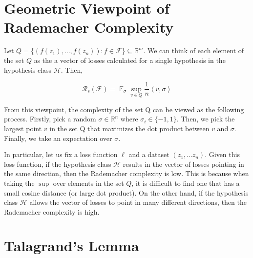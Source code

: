 \documentclass[11pt]{article}
\DeclareMathOperator*{\E}{\mathbb{E}}
\newtheorem{theorem}{Theorem}
\begin{document}


\section{Geometric Viewpoint of Rademacher Complexity}

Let $Q=\{(f(z_1),...,f(z_n)): f \in \mathcal{F}\} \subseteq \mathbb{R}^m$. We can think of each element of the set $Q$ as the a vector of losses calculated for a single hypothesis in the hypothesis class $\mathcal{H}$. Then,

\begin{equation}
\mathcal{R}_s(\mathcal{F}) = \E_{\sigma} \sup_{v \in Q} \frac{1}{n} \left<v,\sigma\right>
\end{equation}

From this viewpoint, the complexity of the set Q can be viewed as the following process. Firstly, pick a random $\sigma \in \mathbb{R}^n$ where $\sigma_i \in \{-1,1\}$. Then, we pick the largest point $v$ in the set Q that maximizes the dot product between $v$ and $\sigma$. Finally, we take an expectation over $\sigma$.

In particular, let us fix a loss function $\ell$ and a dataset $(z_1,...z_n)$. Given this loss function, if the hypothesis class $\mathcal{H}$ results in the vector of losses pointing in the same direction, then the Rademacher complexity is low. This is because when taking the $\sup$ over elements in the set $Q$, it is difficult to find one that has a small cosine distance (or large dot product). On the other hand, if the hypothesis class $\mathcal{H}$ allows the vector of losses to point in many different directions, then the Rademacher complexity is high.

\section{Talagrand's Lemma}
\end{document}
